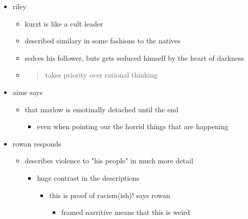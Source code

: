 \documentclass[letterpaper]{article}
\begin{document}
\begin{itemize}
\item riley

\begin{itemize}
\item kurzt is like a cult leader

\item described similary in some fashions to the natives

\item sedces his follower, buts gets seduced himself by the heart of
darkness

\item \begin{quote}
takes priority over rational thinking
\end{quote}
\end{itemize}

\item aime says

\begin{itemize}
\item that marlow is emotinally detached until the end

\begin{itemize}
\item even when pointing our the horrid things that are happening
\end{itemize}
\end{itemize}

\item rowan responds

\begin{itemize}
\item describes violence to "his people" in much more detail

\begin{itemize}
\item huge contrast in the descriptions

\begin{itemize}
\item this is proof of racism(ish)! says rowan

\begin{itemize}
\item framed narritive means that this is weird
\end{itemize}
\end{itemize}
\end{itemize}
\end{itemize}
\end{itemize}
\end{document}
